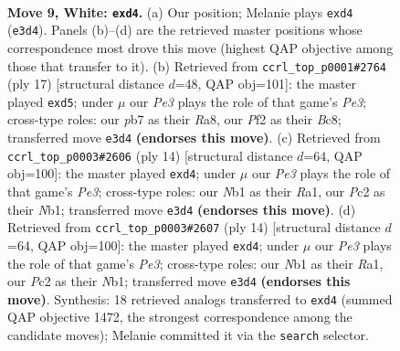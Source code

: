 \documentclass[11pt]{article}
\begin{document}
\clearpage

\begin{figure}[p]\centering
\begin{subfigure}{0.46\textwidth}\centering
\resizebox{\linewidth}{!}{%
\newchessgame
\chessboard[
  setfen={rnbq1rk1/pp3ppp/4pn2/3p4/3p4/3BPNP1/PPP2PP1/RN1Q1RK1 w - - 0 9},
  showmover=false,
  pgfstyle=straightmove, color=movearrow, markmove={e3-d4}
]}
\caption{}
\end{subfigure}\hfill
\begin{subfigure}{0.46\textwidth}\centering
\resizebox{\linewidth}{!}{%
\newchessgame
\chessboard[
  setfen={rnbq1rk1/p4ppp/1p1bpn2/3P4/3P4/P3PN2/1B3PPP/RN1QKB1R b KQ - 0 9},
  showmover=false,
  pgfstyle=straightmove, color=movearrow, markmove={e6-d5}
]}
\caption{}
\end{subfigure}
\\[4pt]
\begin{subfigure}{0.46\textwidth}\centering
\resizebox{\linewidth}{!}{%
\newchessgame
\chessboard[
  setfen={rnbqkb1r/1p3ppp/p3pn2/8/3p4/3BPN2/PP3PPP/RNBQ1RK1 w kq - 0 8},
  showmover=false,
  pgfstyle=straightmove, color=movearrow, markmove={e3-d4}
]}
\caption{}
\end{subfigure}\hfill
\begin{subfigure}{0.46\textwidth}\centering
\resizebox{\linewidth}{!}{%
\newchessgame
\chessboard[
  setfen={rnbqkb1r/1p3ppp/p3pn2/8/3p4/3BPN2/PP3PPP/RNBQ1RK1 w kq - 0 8},
  showmover=false,
  pgfstyle=straightmove, color=movearrow, markmove={e3-d4}
]}
\caption{}
\end{subfigure}
\caption{\textbf{Move 9, White: \texttt{exd4}.} (a) Our position; Melanie plays \texttt{exd4} (\texttt{e3d4}). Panels (b)--(d) are the retrieved master positions whose correspondence most drove this move (highest QAP objective among those that transfer to it). (b) Retrieved from \texttt{ccrl\_top\_p0001\#2764} (ply 17) [structural distance $d$=48, QAP obj=101]: the master played \texttt{exd5}; under $\mu$ our \emph{Pe3} plays the role of that game's \emph{Pe3}; cross-type roles: our \emph{p}b7 as their \emph{R}a8, our \emph{P}f2 as their \emph{B}c8; transferred move \texttt{e3d4} \textbf{(endorses this move)}. (c) Retrieved from \texttt{ccrl\_top\_p0003\#2606} (ply 14) [structural distance $d$=64, QAP obj=100]: the master played \texttt{exd4}; under $\mu$ our \emph{Pe3} plays the role of that game's \emph{Pe3}; cross-type roles: our \emph{N}b1 as their \emph{R}a1, our \emph{P}c2 as their \emph{N}b1; transferred move \texttt{e3d4} \textbf{(endorses this move)}. (d) Retrieved from \texttt{ccrl\_top\_p0003\#2607} (ply 14) [structural distance $d$=64, QAP obj=100]: the master played \texttt{exd4}; under $\mu$ our \emph{Pe3} plays the role of that game's \emph{Pe3}; cross-type roles: our \emph{N}b1 as their \emph{R}a1, our \emph{P}c2 as their \emph{N}b1; transferred move \texttt{e3d4} \textbf{(endorses this move)}. Synthesis: 18 retrieved analogs transferred to \texttt{exd4} (summed QAP objective 1472, the strongest correspondence among the candidate moves); Melanie committed it via the \texttt{search} selector.}
\label{fig:thought-m16}
\end{figure}
\end{document}
